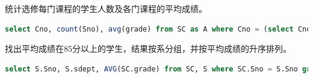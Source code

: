 \documentclass[12pt, a4paper]{report}
\begin{document}
\begin{figure}[H] %
    \centering %
\end{figure}

统计选修每门课程的学生人数及各门课程的平均成绩。\\

\begin{lstlisting}[language=SQL]
    select Cno, count(Sno), avg(grade) from SC as A where Cno = (select Cno from SC as B where A.Cno = B.Cno)  group by Cno;
\end{lstlisting}

\begin{figure}[H] %
    \centering %
\end{figure}

找出平均成绩在85分以上的学生，结果按系分组，并按平均成绩的升序排列。\\

\begin{lstlisting}[language=SQL]
    select S.Sno, S.sdept, AVG(SC.grade) from SC, S where SC.Sno = S.Sno group by S.Sno, S.sdept having avg(SC.grade) > 85 order by AVG(SC.grade) ASC;
\end{lstlisting}

\begin{figure}[H] %
    \centering %
\end{figure}
\end{document}
